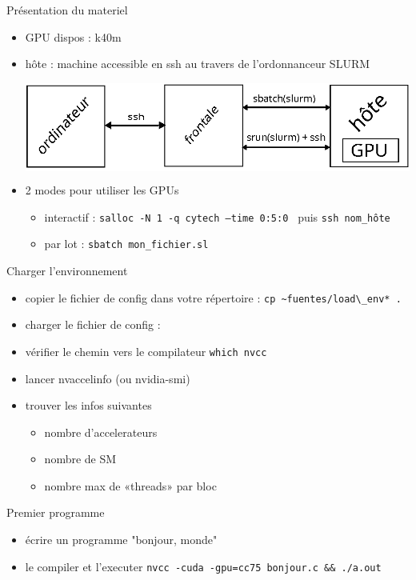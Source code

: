 \documentclass[11pt,mathserif]{beamer}
\begin{document}
\begin{frame}{Présentation du materiel}
  \begin{itemize}[<+->]
    \item GPU dispos : k40m
    \item hôte : machine accessible en ssh au travers de l'ordonnanceur SLURM
\pause
 \begin{center}
   \colorbox{white}{\includegraphics[width=0.7\linewidth]{fig/schema_slurm.eps}}
 \end{center}
    \item 2 modes pour utiliser les GPUs
      \begin{itemize}
        \item interactif : {\tt salloc -N 1 -q cytech --time 0:5:0 } puis {\tt ssh nom\_hôte}
        \item par lot : {\tt sbatch mon\_fichier.sl }
      \end{itemize}
  \end{itemize}
\end{frame}
\begin{frame}{Charger l'environnement}
\begin{itemize}
  \item copier le fichier de config dans votre répertoire : \lstinline$cp ~fuentes/load\_env* .$ 
  \item charger le fichier de config : 
  \item vérifier le chemin vers le compilateur \lstinline$which nvcc$

  \item lancer nvaccelinfo (ou nvidia-smi)

  \item trouver les infos suivantes
  \begin{itemize}
    \item nombre d'accelerateurs
    \item nombre de SM
    \item nombre max de «threads» par bloc
  \end{itemize}
\end{itemize}
\end{frame}
\begin{frame}{Premier programme}
\begin{itemize}
  \item écrire un programme "bonjour, monde"

  \item le compiler et l'executer \lstinline$nvcc -cuda -gpu=cc75 bonjour.c && ./a.out $

\end{itemize}
\end{frame}
\end{document}
